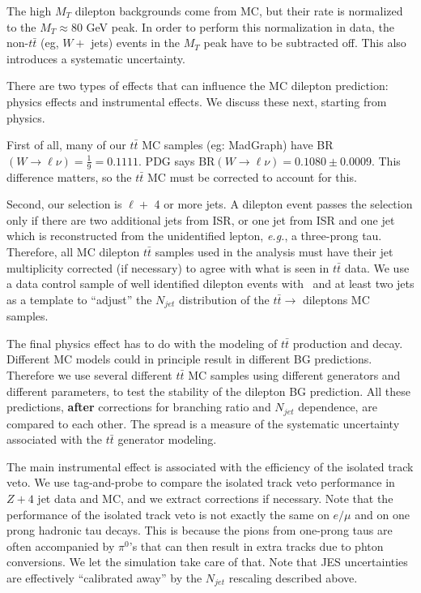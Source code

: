 The high $M_T$ dilepton backgrounds come from MC, but their rate is normalized to the 
$M_T \approx 80$ GeV peak.  In order to perform this normalization in
data, the non-$t\bar{t}$ (eg, $W +$ jets)
events in the $M_T$ peak have to be subtracted off.  This also introduces a systematic uncertainty.

There are two types of effects that can influence the MC dilepton prediction: physics effects 
and instrumental effects.  We discuss these next, starting from physics.

First of all, many of our $t\bar{t}$ MC samples (eg: MadGraph) have
 BR$(W \to \ell \nu)=\frac{1}{9} = 0.1111$.
PDG says BR$(W \to \ell \nu) = 0.1080 \pm 0.0009$.  This difference matters, so the $t\bar{t}$ MC 
must be corrected to account for this.

Second, our selection is $\ell +$ 4 or more jets.  A dilepton event passes the selection only if there are 
two additional jets from ISR, or one jet from ISR and one jet which is reconstructed from the 
unidentified lepton, {\it e.g.}, a three-prong tau.  Therefore, all MC dilepton $t\bar{t}$ samples used
in the analysis must have their jet multiplicity corrected (if necessary) to agree with what is 
seen in $t\bar{t}$ data.  We use a data control sample of well identified dilepton events with
\met\ and at least two jets as a template to ``adjust'' the $N_{jet}$ distribution of the $t\bar{t} \to$
dileptons MC samples.

The final physics effect has to do with the modeling of $t\bar{t}$ production and decay.  Different
MC models could in principle result in different BG predictions.  Therefore we use several different 
$t\bar{t}$ MC samples using different generators and different parameters, to test the stability
of the dilepton BG prediction.  All these predictions, {\bf after} corrections for branching ratio
and $N_{jet}$ dependence, are compared to each other.  The spread is a measure of the systematic
uncertainty associated with the $t\bar{t}$ generator modeling.

The main instrumental effect is associated with the efficiency of the isolated track veto.
We use tag-and-probe to compare the isolated track veto performance in $Z + 4$ jet data and 
MC, and we extract corrections if necessary.  Note that the performance of the isolated track veto 
is not exactly the same on $e/\mu$ and on one prong hadronic tau decays.  This is because
the pions from one-prong taus are often accompanied by $\pi^0$'s that can then result in extra 
tracks due to phton conversions.  We let the simulation take care of that.  
Note that JES uncertainties are effectively ``calibrated away'' by the $N_{jet}$ rescaling described above.  


